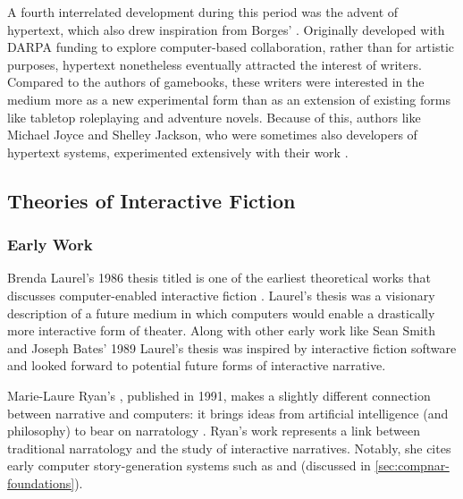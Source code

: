 A fourth interrelated development during this period was the advent of hypertext, which also drew inspiration from Borges' .
%
Originally developed with DARPA funding to explore computer-based collaboration, rather than for artistic purposes, hypertext nonetheless eventually attracted the interest of writers.
%
Compared to the authors of gamebooks, these writers were interested in the medium more as a new experimental form than as an extension of existing forms like tabletop roleplaying and adventure novels.
%
Because of this, authors like Michael Joyce and Shelley Jackson, who were sometimes also developers of hypertext systems, experimented extensively with their work \citep{Joyce1990, Jackson1995}.


\subsection{Theories of Interactive Fiction}

\subsubsection{Early Work}

Brenda Laurel's 1986 thesis titled  is one of the earliest theoretical works that discusses computer-enabled interactive fiction \citep{Laurel1986}.
%
Laurel's thesis was a visionary description of a future medium in which computers would enable a drastically more interactive form of theater.
%
Along with other early work like Sean Smith and Joseph Bates' 1989  \citep{Smith1989} Laurel's thesis was inspired by interactive fiction software and looked forward to potential future forms of interactive narrative.


Marie-Laure Ryan's , published in 1991, makes a slightly different connection between narrative and computers: it brings ideas from artificial intelligence (and philosophy) to bear on narratology \citep{Ryan1991}.
%
Ryan's work represents a link between traditional narratology and the study of interactive narratives.
%
Notably, she cites early computer story-generation systems such as  and  (discussed in \cref{sec:compnar-foundations}).



